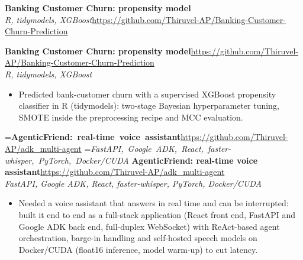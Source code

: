 \documentclass[a4paper,11pt]{article}
\newcommand{\project}[3]{%
  \textbf{#1}\hfill#3\\ {\color{muted}\small\textit{#2}}\par}
\newcommand{\gap}{\vspace{5pt}}
\begin{document}
\else
\textbf{Banking Customer Churn: propensity model}\\ {\color{muted}\small\textit{R, tidymodels, XGBoost}}\hfill{\small\url{https://github.com/Thiruvel-AP/Banking-Customer-Churn-Prediction}}\par
\fi
\else
\project{Banking Customer Churn: propensity model}{R, tidymodels, XGBoost}{\url{https://github.com/Thiruvel-AP/Banking-Customer-Churn-Prediction}}
\fi
\begin{itemize}
  \item Predicted bank-customer churn with a supervised XGBoost propensity classifier in R (tidymodels): two-stage Bayesian hyperparameter tuning, SMOTE inside the preprocessing recipe and MCC evaluation.
\end{itemize}
\gap
{}
=\hbox{\textbf{AgenticFriend: real-time voice assistant}\hspace{1em}\url{https://github.com/Thiruvel-AP/adk_multi-agent}}%
=\hbox{{\small\textit{FastAPI, Google ADK, React, faster-whisper, PyTorch, Docker/CUDA}}}%
\ifdim\wd0>\linewidth
\ifdim\wd2>\linewidth
\textbf{AgenticFriend: real-time voice assistant}\\ {\color{muted}\small\textit{FastAPI, Google ADK, React, faster-whisper, PyTorch, Docker/CUDA}}\\ \hspace*{\fill}{\small\url{https://github.com/Thiruvel-AP/adk_multi-agent}}\par
\else
\textbf{AgenticFriend: real-time voice assistant}\\ {\color{muted}\small\textit{FastAPI, Google ADK, React, faster-whisper, PyTorch, Docker/CUDA}}\hfill{\small\url{https://github.com/Thiruvel-AP/adk_multi-agent}}\par
\fi
\else
\project{AgenticFriend: real-time voice assistant}{FastAPI, Google ADK, React, faster-whisper, PyTorch, Docker/CUDA}{\url{https://github.com/Thiruvel-AP/adk_multi-agent}}
\fi
\begin{itemize}
  \item Needed a voice assistant that answers in real time and can be interrupted: built it end to end as a full-stack application (React front end, FastAPI and Google ADK back end, full-duplex WebSocket) with ReAct-based agent orchestration, barge-in handling and self-hosted speech models on Docker/CUDA (float16 inference, model warm-up) to cut latency.
\end{itemize}
\end{document}
